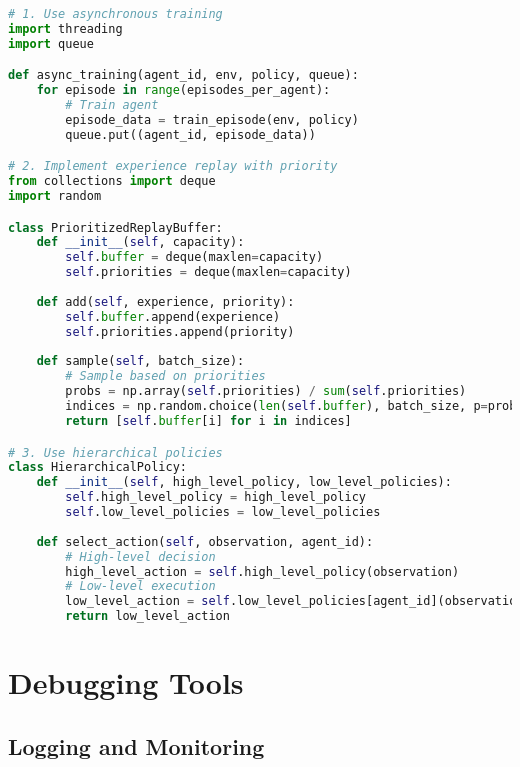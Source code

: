 \begin{lstlisting}[language=python, caption=Scale Multi-Agent Training]
# 1. Use asynchronous training
import threading
import queue

def async_training(agent_id, env, policy, queue):
    for episode in range(episodes_per_agent):
        # Train agent
        episode_data = train_episode(env, policy)
        queue.put((agent_id, episode_data))

# 2. Implement experience replay with priority
from collections import deque
import random

class PrioritizedReplayBuffer:
    def __init__(self, capacity):
        self.buffer = deque(maxlen=capacity)
        self.priorities = deque(maxlen=capacity)
    
    def add(self, experience, priority):
        self.buffer.append(experience)
        self.priorities.append(priority)
    
    def sample(self, batch_size):
        # Sample based on priorities
        probs = np.array(self.priorities) / sum(self.priorities)
        indices = np.random.choice(len(self.buffer), batch_size, p=probs)
        return [self.buffer[i] for i in indices]

# 3. Use hierarchical policies
class HierarchicalPolicy:
    def __init__(self, high_level_policy, low_level_policies):
        self.high_level_policy = high_level_policy
        self.low_level_policies = low_level_policies
    
    def select_action(self, observation, agent_id):
        # High-level decision
        high_level_action = self.high_level_policy(observation)
        # Low-level execution
        low_level_action = self.low_level_policies[agent_id](observation, high_level_action)
        return low_level_action
\end{lstlisting}

\section{Debugging Tools}

\subsection{Logging and Monitoring}

